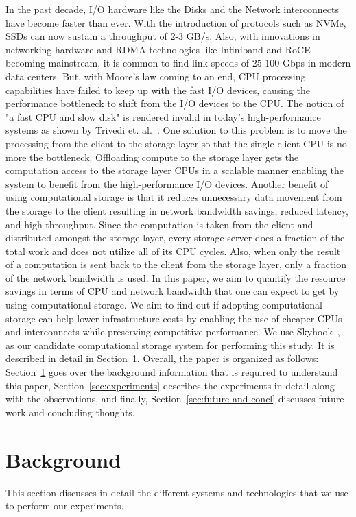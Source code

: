 \documentclass[11pt]{article}
\begin{document}
In the past decade, I/O hardware like the Disks and the Network interconnects have become faster than ever. With the introduction of protocols such as NVMe, SSDs can now sustain a throughput of $2$-$3$ GB/s. Also, with innovations in networking hardware and RDMA technologies like Infiniband and RoCE becoming mainstream, it is common to find link speeds of $25$-$100$ Gbps in modern data centers. But, with Moore's law coming to an end, CPU processing capabilities have failed to keep up with the fast I/O devices, causing the performance bottleneck to shift from the I/O devices to the CPU. The notion of "a fast CPU and slow disk" is rendered invalid in today's high-performance systems as shown by Trivedi et. al.~\cite{trivedi2018albis}. One solution to this problem is to move the processing from the client to the storage layer so that the single client CPU is no more the bottleneck. Offloading compute to the storage layer gets the computation access to the storage layer CPUs in a scalable manner enabling the system to benefit from the high-performance I/O devices. Another benefit of using computational storage is that it reduces unnecessary data movement from the storage to the client resulting in network bandwidth savings, reduced latency, and high throughput. Since the computation is taken from the client and distributed amongst the storage layer, every storage server does a fraction of the total work and does not utilize all of its CPU cycles. Also, when only the result of a computation is sent back to the client from the storage layer, only a fraction of the network bandwidth is used. In this paper, we aim to quantify the resource savings in terms of CPU and network bandwidth that one can expect to get by using computational storage. We aim to find out if adopting computational storage can help lower infrastructure costs by enabling the use of cheaper CPUs and interconnects while preserving competitive performance. We use Skyhook~\cite{chakraborty2022skyhook}, as our candidate computational storage system for performing this study. It is described in detail in Section~\ref{sec:background}. Overall, the paper is organized as follows: Section~\ref{sec:background} goes over the background information that is required to understand this paper, Section~\ref{sec:experiments} describes the experiments in detail along with the observations, and finally, Section~\ref{sec:future-and-concl} discusses future work and concluding thoughts.

\section{Background}
\label{sec:background}
This section discusses in detail the different systems and technologies that we use to perform our experiments.
\end{document}
